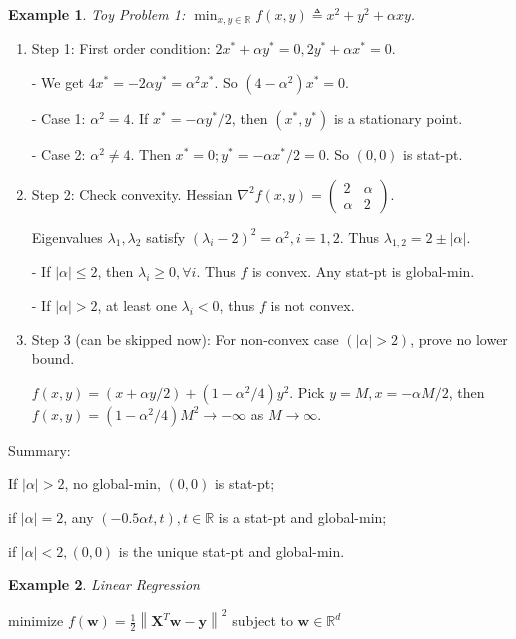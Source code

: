 \documentclass[11pt,a4paper]{article}
\newtheorem{example}{Example}
\begin{document}
\begin{example}
    Toy Problem 1: $\min _{x, y \in \mathbb{R}} f(x, y) \triangleq x^{2}+y^{2}+\alpha x y$.
\end{example}
\begin{enumerate}
    \item Step 1: First order condition: $2 x^{*}+\alpha y^{*}=0,2 y^{*}+\alpha x^{*}=0$.
    
    - We get $4 x^{*}=-2 \alpha y^{*}=\alpha^{2} x^{*}$. So $\left(4-\alpha^{2}\right) x^{*}=0$.
    
    - Case 1: $\alpha^{2}=4$. If $x^{*}=-\alpha y^{*} / 2$, then $\left(x^{*}, y^{*}\right)$ is a stationary point.
    
    - Case 2: $\alpha^{2} \neq 4$. Then $x^{*}=0 ; y^{*}=-\alpha x^{*} / 2=0$. So $(0,0)$ is stat-pt.
    \item Step 2: Check convexity. Hessian $\nabla^{2} f(x, y)=\left(\begin{array}{ll}2 & \alpha \\ \alpha & 2\end{array}\right)$.
    
    Eigenvalues $\lambda_{1}, \lambda_{2}$ satisfy $\left(\lambda_{i}-2\right)^{2}=\alpha^{2}, i=1,2$.
    Thus $\lambda_{1,2}=2 \pm|\alpha|$.

    - If $|\alpha| \leq 2$, then $\lambda_{i} \geq 0, \forall i$. Thus $f$ is convex. Any stat-pt is global-min.

    - If $|\alpha|>2$, at least one $\lambda_{i}<0$, thus $f$ is not convex.
    \item Step 3 (can be skipped now): For non-convex case $(|\alpha|>2)$, prove no lower bound.
    
    $f(x, y)=(x+\alpha y / 2)+\left(1-\alpha^{2} / 4\right) y^{2}$. Pick $y=M, x=-\alpha M / 2$, then
    $f(x, y)=\left(1-\alpha^{2} / 4\right) M^{2} \rightarrow-\infty$ as $M \rightarrow \infty$.
\end{enumerate}

Summary:

If $|\alpha|>2$, no global-min, $(0,0)$ is stat-pt;

if $|\alpha|=2$, any $(-0.5 \alpha t, t), t \in \mathbb{R}$ is a stat-pt and global-min;

if $|\alpha|<2,(0,0)$ is the unique stat-pt and global-min.

\begin{example}
Linear Regression
\end{example}
$\text{minimize } f(\mathbf{w})=\frac{1}{2}\left\|\mathbf{X}^{T} \mathbf{w}-\mathbf{y}\right\|^{2}$ subject to $ \mathbf{w} \in \mathbb{R}^{d}$
\end{document}
